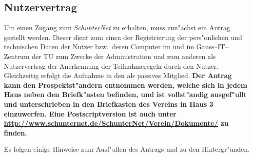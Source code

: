 \subsection{Nutzervertrag}

Um einen Zugang zum \emph{SchunterNet} zu erhalten, muss zun"achst ein
Antrag gestellt werden. Dieser dient zum einen der Registrierung der
pers"onlichen und technischen Daten der Nutzer bzw.\  deren Computer im
\snev und im Gauss--IT--Zentrum der TU zum Zwecke der \glossar Administration und
zum anderen als Nutzervertrag der Anerkennung der Teilnahmeregeln durch den
Nutzer. Gleichzeitig erfolgt die Aufnahme in den \snev als passives Mitglied.
\bf Der Antrag kann den Prospektst"andern entnommen werden, welche sich in jedem
Haus neben den Briefk"asten befinden, und ist vollst"andig ausgef"ullt und
unterschrieben in den Briefkasten des Vereins in Haus 3 einzuwerfen. Eine
Postscriptversion ist auch unter
\url{http://www.schunternet.de/SchunterNet/Verein/Dokumente/} zu
finden.

\rm Es folgen einige Hinweise zum Ausf"ullen des Antrags und zu den Hintergr"unden.

